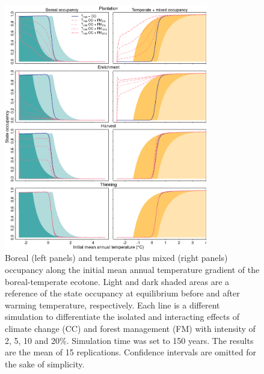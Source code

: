\hypertarget{fig:sim-result-supp5_ch1}{%
\begin{figure}
\centering
\includegraphics[width=0.79\textwidth,height=\textheight]{manuscript/img/sim-result_supp3.png}
\caption[{Boreal (left panels) and temperate plus mixed (right panels)
occupancy along the initial mean annual temperature gradient of the
boreal-temperate ecotone.}]{Boreal (left panels) and temperate plus
mixed (right panels) occupancy along the initial mean annual temperature
gradient of the boreal-temperate ecotone. Light and dark shaded areas
are a reference of the state occupancy at equilibrium before and after
warming temperature, respectively. Each line is a different simulation
to differentiate the isolated and interacting effects of climate change
(CC) and forest management (FM) with intensity of 2, 5, 10 and 20\%.
Simulation time was set to 150 years. The results are the mean of 15
replications. Confidence intervals are omitted for the sake of
simplicity.}
\label{fig:sim-result-supp5_ch1}
\end{figure}
}

\newpage

